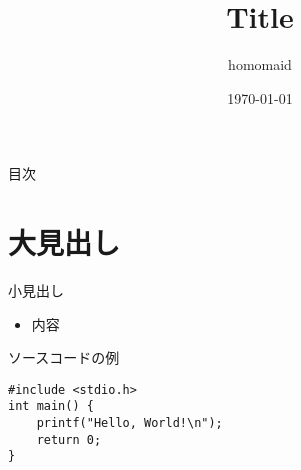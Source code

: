 \documentclass[dvipdfmx,uplatex,t]{beamer}
\title{Title}
\author{homomaid}
\date{\today}
\institute{}
\begin{document}
 
    \frame{\maketitle}

    \begin{frame}{目次}
        \tableofcontents
    \end{frame}

    \section{大見出し}
    \begin{frame}{小見出し}
        \begin{itemize}
            \item 内容
        \end{itemize}
    \end{frame}

    \begin{frame}[fragile]{ソースコードの例}
        \begin{lstlisting}
#include <stdio.h>
int main() {
    printf("Hello, World!\n");
    return 0;
}
        \end{lstlisting}
    \end{frame}
\end{document}
